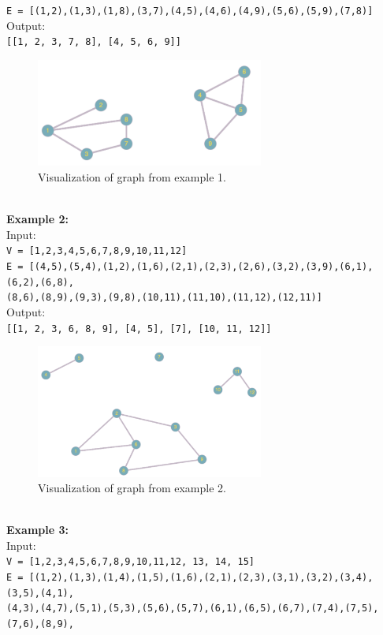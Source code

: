 \documentclass[a4paper,11pt]{article}
\begin{document}
\texttt{E = [(1,2),(1,3),(1,8),(3,7),(4,5),(4,6),(4,9),(5,6),(5,9),(7,8)]}
\\
Output: \\
\texttt{[[1, 2, 3, 7, 8], [4, 5, 6, 9]]}
\begin{figure}[ht!]
    \centering
    \includegraphics[width=75mm]{example1.png}
    \caption{Visualization of graph from example 1.}
\end{figure}
\\
\textbf{Example 2:} \\
Input: \\
\texttt{V = [1,2,3,4,5,6,7,8,9,10,11,12]} \\
\texttt{E = [(4,5),(5,4),(1,2),(1,6),(2,1),(2,3),(2,6),(3,2),(3,9),(6,1),(6,2),(6,8),} \\
\texttt{(8,6),(8,9),(9,3),(9,8),(10,11),(11,10),(11,12),(12,11)]}
\\
Output: \\
\texttt{[[1, 2, 3, 6, 8, 9], [4, 5], [7], [10, 11, 12]]}
\begin{figure}[ht!]
    \centering
    \includegraphics[width=75mm]{example2.png}
    \caption{Visualization of graph from example 2.}
\end{figure}
\\
\textbf{Example 3:} \\
Input: \\
\texttt{V = [1,2,3,4,5,6,7,8,9,10,11,12, 13, 14, 15]} \\
\texttt{E = [(1,2),(1,3),(1,4),(1,5),(1,6),(2,1),(2,3),(3,1),(3,2),(3,4),(3,5),(4,1),} \\
\texttt{(4,3),(4,7),(5,1),(5,3),(5,6),(5,7),(6,1),(6,5),(6,7),(7,4),(7,5),(7,6),(8,9),} \\
\end{document}
